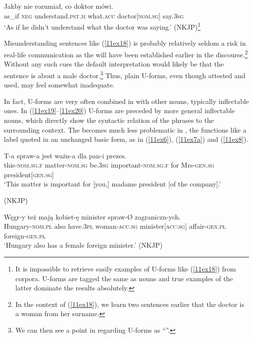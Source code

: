 \documentclass[output=paper,colorlinks,citecolor=brown]{langscibook}
\begin{document}
\begin{exe}
	\ex \label{11ex18}
	\gll Jakby nie rozumiał, co doktor mówi. \\
	as\_if \textsc{neg} understand.\textsc{pst.m} what.\textsc{acc} doctor[\textsc{nom.sg}] say.\textsc{3sg} \\
	\trans ‘As if he didn’t understand what the doctor was saying.’ \hfill (NKJP)\footnote{It is impossible to retrieve easily examples of U-forms like (\ref{11ex18}) from corpora. U-forms are tagged the same as  nouns and true examples of the latter dominate the results absolutely.}
\end{exe}

Misunderstanding sentences like (\ref{11ex18}) is probably relatively seldom a risk in real-life communication as the  will have been established earlier in the discourse.\footnote{In the context of (\ref{11ex18}), we learn two sentences earlier that the doctor is a woman from her  surname.\label{11ftn17}} Without any such cues the default interpretation would likely be that the sentence is about a male doctor.\footnote{We can then see a point in regarding U-forms as ``''.} Thus, plain U-forms, even though attested and used, may feel somewhat inadequate.

In fact, U-forms are very often combined in  with other  nouns, typically inflectable ones. In (\ref{11ex19}--\ref{11ex20}) U-forms are preceded by more general inflectable nouns, which directly show the syntactic relation of the phrases to the surrounding context. The  becomes much less problematic in , the  functions like a label quoted in an unchanged basic form, as in (\ref{11ex6}), (\ref{11ex7a}) and (\ref{11ex8}).

\begin{exe}
	\ex \label{11ex19}
	\gll T-a spraw-a jest ważn-a dla pan-i prezes. \\
	this-\textsc{nom.sg.f} matter-\textsc{nom.sg} be.\textsc{3sg} important-\textsc{nom.sg.f} for Mrs-\textsc{gen.sg} president[\textsc{gen.sg}] \\
	\trans ‘This matter is important for [you,] madame president [of the company].’
	
	\hfill (NKJP)
	
	\ex \label{11ex20}
	\gll Węgr-y też mają kobiet-ę minister spraw-Ø zagraniczn-ych. \\
	Hungary-\textsc{nom.pl} also have.\textsc{3pl} woman-\textsc{acc.sg} minister[\textsc{acc.sg}] affair-\textsc{gen.pl} foreign-\textsc{gen.pl} \\
	\trans ‘Hungary also has a female foreign minister.’ \hfill (NKJP)
\end{exe}
\end{document}
